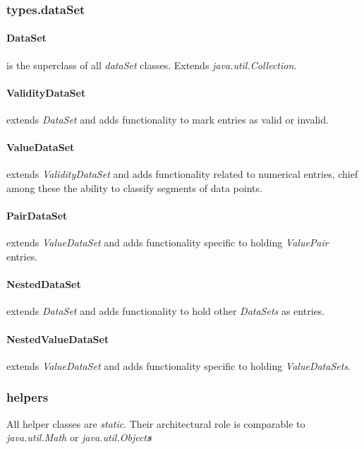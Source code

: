\documentclass[main.tex]{subfiles}
\begin{document}
      \subsubsection*{types.dataSet}
        
        \paragraph{DataSet} is the superclass of all \textit{dataSet} classes. Extends \textit{java.util.Collection}.
        
        \paragraph{ValidityDataSet} extends \textit{DataSet} and adds functionality to mark entries as valid or invalid.
        
        \paragraph{ValueDataSet} extends \textit{ValidityDataSet} and adds functionality related to numerical entries, chief among these the ability to classify segments of data points.
        
        \paragraph{PairDataSet} extends \textit{ValueDataSet} and adds functionality specific to holding \textit{ValuePair} entries.
        
        \paragraph{NestedDataSet} extends \textit{DataSet} and adds functionality to hold other \textit{DataSets} as entries.
        
        \paragraph{NestedValueDataSet} extends \textit{ValueDataSet} and adds functionality specific to holding \textit{ValueDataSets}.
        
      \subsubsection*{helpers}
        
        All helper classes are \textit{static}. Their architectural role is comparable to \textit{java.util.Math} or \textit{java.util.Object\textbf{s}}
        
\end{document}
